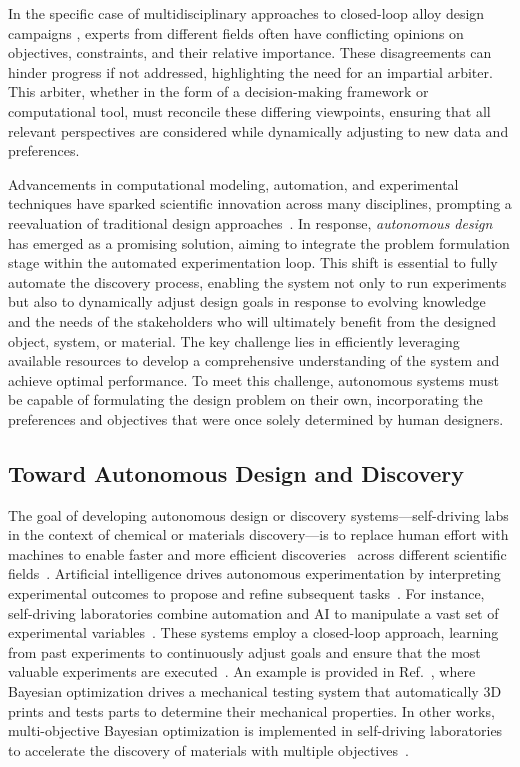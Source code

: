 \documentclass[final,5p,times,twocolumn]{elsarticle}
\begin{document}
In the specific case of multidisciplinary approaches to closed-loop alloy design campaigns \cite{hastings2024interoperable,mulukutla2024illustrating}, experts from different fields often have conflicting opinions on objectives, constraints, and their relative importance. These disagreements can hinder progress if not addressed, highlighting the need for an impartial arbiter. This arbiter, whether in the form of a decision-making framework or computational tool, must reconcile these differing viewpoints, ensuring that all relevant perspectives are considered while dynamically adjusting to new data and preferences.

Advancements in computational modeling, automation, and experimental techniques have sparked scientific innovation across many disciplines, prompting a reevaluation of traditional design approaches~\cite{shi2021automated}. In response, \emph{autonomous design} has emerged as a promising solution, aiming to integrate the problem formulation stage within the automated experimentation loop. This shift is essential to fully automate the discovery process, enabling the system not only to run experiments but also to dynamically adjust design goals in response to evolving knowledge and the needs of the stakeholders who will ultimately benefit from the designed object, system, or material. The key challenge lies in efficiently leveraging available resources to develop a comprehensive understanding of the system and achieve optimal performance. To meet this challenge, autonomous systems must be capable of formulating the design problem on their own, incorporating the preferences and objectives that were once solely determined by human designers.

\subsection{Toward Autonomous Design and Discovery}
The goal of developing autonomous design or discovery systems---self-driving labs in the context of chemical or materials discovery---is to replace human effort with machines to enable faster and more efficient discoveries~\cite{CRABTREE20202538} across different scientific fields~\cite{ament2021autonomous,bash2021multi,langner2020beyond,gongora2020bayesian,deneault2021toward,epps2020artificial,christensen2021data,grizou2020curious,cao2021optimization}. Artificial intelligence drives autonomous experimentation by interpreting experimental outcomes to propose and refine subsequent tasks~\cite{szymanski2021toward,epps2020artificial}. For instance, self-driving laboratories combine automation and AI to manipulate a vast set of experimental variables~\cite{macleod2022self}. These systems employ a closed-loop approach, learning from past experiments to continuously adjust goals and ensure that the most valuable experiments are executed~\cite{hase2019next}. An example is provided in Ref.~\cite{gongora2020bayesian}, where Bayesian optimization drives a mechanical testing system that automatically 3D prints and tests parts to determine their mechanical properties. In other works, multi-objective Bayesian optimization is implemented in self-driving laboratories to accelerate the discovery of materials with multiple objectives~\cite{macleod2022self,macleod2021advancing}.
\end{document}
